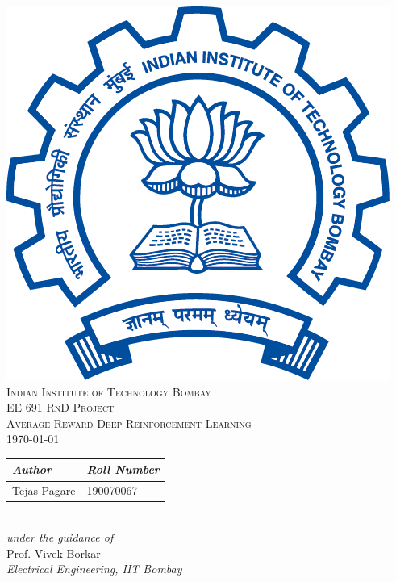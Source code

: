 \documentclass{article}
\theoremstyle{definition}
\def\date{\today}                         %
\begin{document}
\begin{center}
    \vspace*{1.5cm}
    \includegraphics[scale = 0.5]{iitb-logo.png}\\[1.75cm]
    \textsc{\color[RGB]{0, 51, 102}\LARGE{Indian Institute of Technology Bombay}}\\[1cm]
    \textsc{\Large{EE 691 RnD Project}}\\[.5cm]
    \textsc{\Large{Average Reward Deep Reinforcement Learning}}\\[.5cm]
    \textsc{\date}\\[2cm]
    \Large{
    \begin{tabular}{L{4cm} R{4cm}}
        \textit{Author} &  \textit{Roll Number}\\
        \hline
        Tejas Pagare & 190070067
    \end{tabular}
    }\\
    \vspace{1cm}
    \textit{under the guidance of}
    \\\vspace{1cm}
    Prof. Vivek Borkar\\
    \vspace{0.2cm}
    \textit{Electrical Engineering, IIT Bombay}\\[.5cm]
    
\end{center}
\thispagestyle{empty}
\pagebreak
\end{document}
